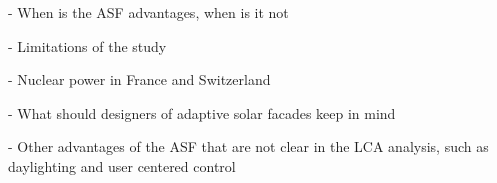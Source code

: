 
- When is the ASF advantages, when is it not

- Limitations of the study

- Nuclear power in France and Switzerland

- What should designers of adaptive solar facades keep in mind 

- Other advantages of the ASF that are not clear in the LCA analysis, such as daylighting and user centered control 
